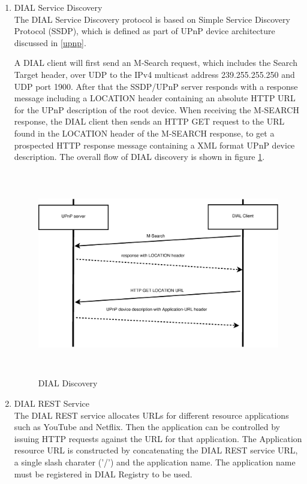 \begin{enumerate} 
\item DIAL Service Discovery \\ 
The DIAL Service Discovery protocol is based on Simple Service Discovery 
Protocol (SSDP), which is defined as part of UPnP device architecture discussed 
in \ref{upnp}. 

A DIAL client will first send an M-Search request, which includes  the Search Target 
header, over UDP to the IPv4 multicast address 239.255.255.250 and UDP port 1900. After that the SSDP/UPnP server responds with a response message including a LOCATION header 
containing an absolute HTTP URL for the UPnP description of the root device. 
When receiving the M-SEARCH response, the DIAL client then sends an HTTP GET 
request to the URL found in the LOCATION header of the M-SEARCH response, to 
get a prospected HTTP response message containing a XML format UPnP device description. The 
overall flow of DIAL discovery is shown in figure \ref{dial_discovery}. 

\begin{figure}[htb] \centering 
\includegraphics[height=9cm]{charts/dial_discovery} 
\caption{DIAL Discovery \label{dial_discovery}} 
\end{figure} 

\item DIAL REST Service \\ 
The DIAL REST service allocates URLs for different resource applications such as 
YouTube and Netflix. Then the application can be controlled by issuing HTTP 
requests against the URL for that application. The Application resource URL is 
constructed by concatenating the DIAL REST service URL, a single slash charater 
('/') and the application name. The application name must be registered in DIAL 
Registry to be used. 


\end{enumerate}
